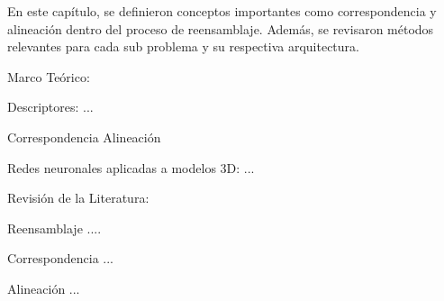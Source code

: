 \hfill\break
\indent En este capítulo, se definieron conceptos importantes como correspondencia y alineación dentro del proceso de reensamblaje. Además, se revisaron métodos relevantes para cada sub problema y su respectiva arquitectura. 

\hfill \break

Marco Teórico:

Descriptores:
...

Correspondencia
Alineación

Redes neuronales aplicadas a modelos 3D:
...


Revisión de la Literatura:

Reensamblaje
....

Correspondencia
...

Alineación
...
